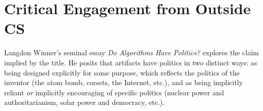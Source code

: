 \documentclass{article}
\begin{document}
\section{Critical Engagement from Outside CS}
    Langdon Winner's seminal essay \textit{Do Algorithms Have Politics?}\cite{winnerArtifactsHavePolitics1980} explores the claim implied by the title. He posits that artifacts have politics in two distinct ways: as being designed explicitly for some purpose, which reflects the politics of the inventor (the atom bomb, corsets, the Internet, etc.), and as being implicitly reliant \textit{or} implicitly encouraging of specific politics (nuclear power and authoritarianism, solar power and democracy, etc.).
    
%
%


\end{document}
